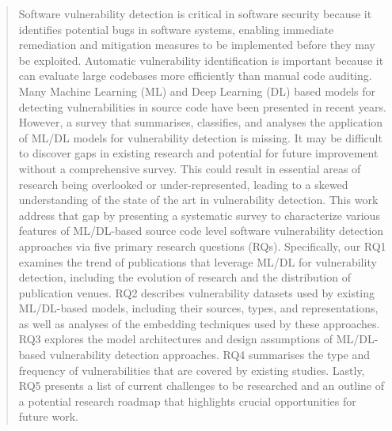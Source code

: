 \documentclass[acmsmall]{acmart}
\begin{document}
\begin{abstract}
Software vulnerability detection is critical in software security because it identifies potential bugs in software systems, enabling immediate remediation and mitigation measures to be implemented before they may be exploited. Automatic vulnerability identification is important because it can evaluate large codebases more efficiently than manual code auditing. Many Machine Learning (ML) and Deep Learning (DL) based models for detecting vulnerabilities in source code have been presented in recent years. However, a survey that summarises, classifies, and analyses the application of ML/DL models for vulnerability detection is missing. It may be difficult to discover gaps in existing research and potential for future improvement without a comprehensive survey. This could result in essential areas of research being overlooked or under-represented, leading to a skewed understanding of the state of the art in vulnerability detection. This work address that gap by presenting a systematic survey to characterize various features of ML/DL-based source code level software vulnerability detection approaches via five primary research questions (RQs). Specifically, our RQ1 examines the trend of publications that leverage ML/DL for vulnerability detection, including the evolution of research and the distribution of publication venues. RQ2 describes vulnerability datasets used by existing ML/DL-based models, including their sources, types, and representations, as well as analyses of the embedding techniques used by these approaches. RQ3 explores the model architectures and design assumptions of ML/DL-based vulnerability detection approaches. RQ4 summarises the type and frequency of vulnerabilities that are covered by existing studies. Lastly, RQ5 presents a list of current challenges to be researched and an outline of a potential research roadmap that highlights crucial opportunities for future work.


\end{abstract}
\end{document}
